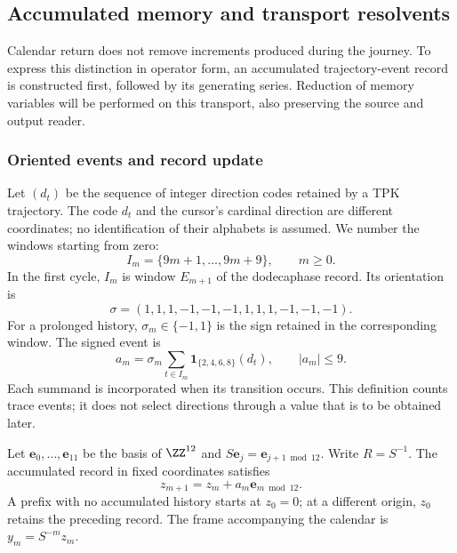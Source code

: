 \subsection{Accumulated memory and transport resolvents}
\label{subsec:memoria-resolvente}

Calendar return does not remove increments produced during the journey.
To express this distinction in operator form, an accumulated trajectory-event
record is constructed first, followed by its generating series. Reduction
of memory variables will be performed on this transport, also preserving
the source and output reader.

\subsubsection{Oriented events and record update}

Let \((d_t)\) be the sequence of integer direction codes retained by
a TPK trajectory. The code \(d_t\) and the cursor's cardinal direction
are different coordinates; no identification of their alphabets is assumed.
We number the windows starting from zero:
\[
 I_m=\{9m+1,\ldots,9m+9\},\qquad m\geq0.
\]
In the first cycle, \(I_m\) is window \(E_{m+1}\) of the
dodecaphase record. Its orientation is
\[
\sigma=(1,1,1,-1,-1,-1,1,1,1,-1,-1,-1).
\]
For a prolonged history, \(\sigma_m\in\{-1,1\}\) is the sign
retained in the corresponding window. The signed event is
\begin{equation}
 a_m=\sigma_m\sum_{t\in I_m}
       \mathbf1_{\{2,4,6,8\}}(d_t),\qquad |a_m|\leq9.
 \label{mem:evento}
\end{equation}
Each summand is incorporated when its transition occurs. This definition
counts trace events; it does not select directions through a value
that is to be obtained later.

Let \(\mathbf e_0,\ldots,\mathbf e_{11}\) be the basis of \(\ZZ^{12}\)
and \(S\mathbf e_j=\mathbf e_{j+1\bmod12}\). Write
\(R=S^{-1}\). The accumulated record in fixed coordinates satisfies
\[
z_{m+1}=z_m+a_m\mathbf e_{m\bmod12}.
\]
A prefix with no accumulated history starts at \(z_0=0\); at a different
origin, \(z_0\) retains the preceding record.
The frame accompanying the calendar is \(y_m=S^{-m}z_m\).

